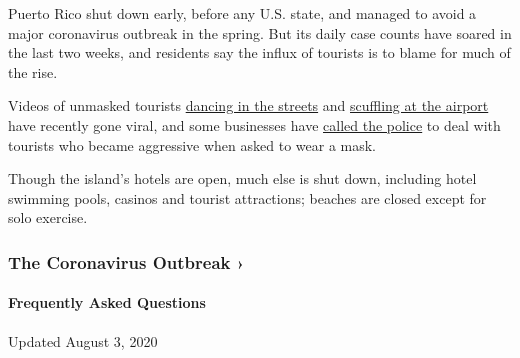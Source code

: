 Puerto Rico shut down early, before any U.S. state, and managed to avoid
a major coronavirus outbreak in the spring. But its daily case counts
have soared in the last two weeks, and residents say the influx of
tourists is to blame for much of the rise.

Videos of unmasked tourists
\href{https://www.telemundopr.com/noticias/puerto-rico/sin-mascarilla-y-distanciamiento-decenas-de-turistas-por-la-libre-en-condado/2105861/}{dancing
in the streets} and
\href{https://www.facebook.com/100000978562895/videos/4176373252405252/}{scuffling
at the airport} have recently gone viral, and some businesses have
\href{https://www.telemundopr.com/noticias/puerto-rico/sin-mascarilla-y-distanciamiento-decenas-de-turistas-por-la-libre-en-condado/2105861/}{called
the police} to deal with tourists who became aggressive when asked to
wear a mask.

Though the island's hotels are open, much else is shut down, including
hotel swimming pools, casinos and tourist attractions; beaches are
closed except for solo exercise.

\href{https://www.nytimes.com/news-event/coronavirus?action=click\&pgtype=Article\&state=default\&region=MAIN_CONTENT_3\&context=storylines_faq}{}

\hypertarget{the-coronavirus-outbreak-}{%
\subsubsection{The Coronavirus Outbreak
›}\label{the-coronavirus-outbreak-}}

\hypertarget{frequently-asked-questions}{%
\paragraph{Frequently Asked
Questions}\label{frequently-asked-questions}}

Updated August 3, 2020

